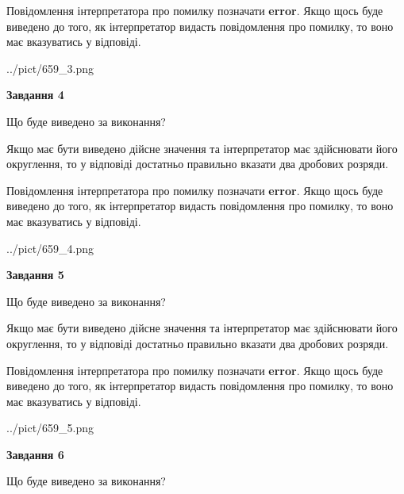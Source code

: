 \documentclass[12pt, ukrainian]{article}
\begin{document}
{\begin {Large}
Повідомлення інтерпретатора про помилку позначати \textbf{error}.
Якщо щось буде виведено до того, як інтерпретатор видасть повідомлення про помилку, 
то воно має вказуватись у відповіді. \par

\begin{center}
	{../pict/659_3.png}
\end{center}
\newpage

{\begin {center}\textbf{Завдання 4}\end {center}}\par
Що буде виведено за виконання? \par

Якщо має бути виведено дійсне значення та інтерпретатор має здійснювати його округлення, 
то у відповіді достатньо правильно вказати два дробових розряди.

Повідомлення інтерпретатора про помилку позначати \textbf{error}.
Якщо щось буде виведено до того, як інтерпретатор видасть повідомлення про помилку, 
то воно має вказуватись у відповіді. \par

\begin{center}
	{../pict/659_4.png}
\end{center}
\newpage

{\begin {center}\textbf{Завдання 5}\end {center}}\par
Що буде виведено за виконання? \par

Якщо має бути виведено дійсне значення та інтерпретатор має здійснювати його округлення, 
то у відповіді достатньо правильно вказати два дробових розряди.

Повідомлення інтерпретатора про помилку позначати \textbf{error}.
Якщо щось буде виведено до того, як інтерпретатор видасть повідомлення про помилку, 
то воно має вказуватись у відповіді. \par

\begin{center}
	{../pict/659_5.png}
\end{center}
\newpage

{\begin {center}\textbf{Завдання 6}\end {center}}\par
Що буде виведено за виконання? \par


\end{Large}}
\end{document}
